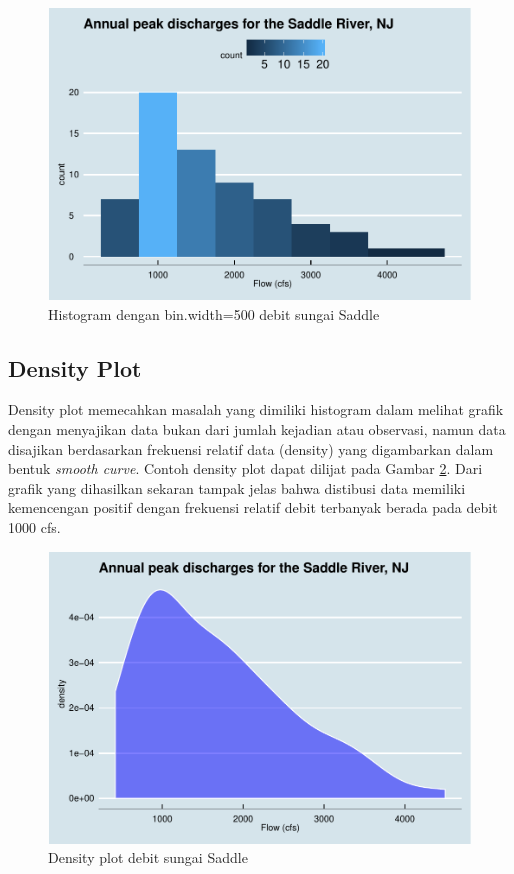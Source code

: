 \documentclass[]{book}
\begin{document}
\begin{figure}

{\centering \includegraphics[width=0.7\linewidth]{EnvStat_files/figure-latex/histeda2-1} 

}

\caption{Histogram dengan bin.width=500 debit sungai Saddle}\label{fig:histeda2}
\end{figure}

\subsection{Density Plot}\label{density-plot}

Density plot memecahkan masalah yang dimiliki histogram dalam melihat
grafik dengan menyajikan data bukan dari jumlah kejadian atau observasi,
namun data disajikan berdasarkan frekuensi relatif data (density) yang
digambarkan dalam bentuk \emph{smooth curve}. Contoh density plot dapat
dilijat pada Gambar \ref{fig:denseda}. Dari grafik yang dihasilkan
sekaran tampak jelas bahwa distibusi data memiliki kemencengan positif
dengan frekuensi relatif debit terbanyak berada pada debit 1000 cfs.

\begin{figure}

{\centering \includegraphics[width=0.7\linewidth]{EnvStat_files/figure-latex/denseda-1} 

}

\caption{Density plot debit sungai Saddle}\label{fig:denseda}
\end{figure}
\end{document}
